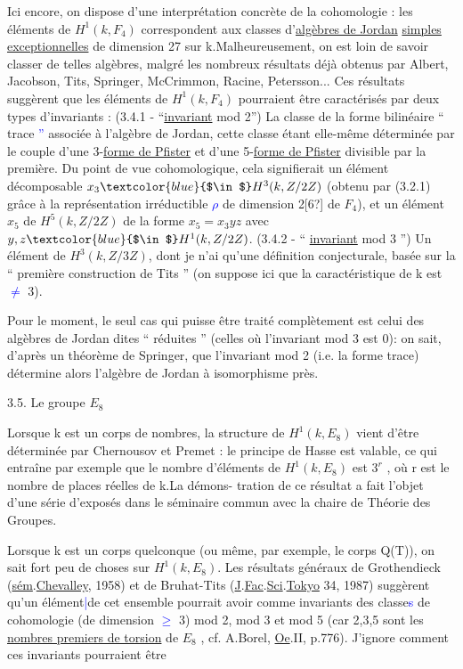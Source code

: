 \documentclass[11pt]{article}
\newcommand{\hand}[1]{\textcolor{blue}{#1}}
\newcommand{\uline}[1]{\underline{#1}}
\newcommand{\unsure}[1]{[#1?]}
\begin{document}
Ici encore, on dispose d'une interprétation concrète de la cohomologie :
les éléments de $H^1(k, F_4)$ correspondent aux classes d'\uline{algèbres de Jordan}
\uline{simples exceptionnelles} de dimension 27 sur k.Malheureusement, on
est loin de savoir classer de telles algèbres, malgré les nombreux
résultats déjà obtenus par Albert, Jacobson, Tits, Springer, McCrimmon,
Racine, Petersson... Ces résultats suggèrent que les éléments de
$H^1(k, F_4)$ pourraient être caractérisés par deux types d'invariants :
(3.4.1 - ``\uline{invariant} mod 2'') La classe de la forme bilinéaire `` trace \hand{''}
associée à l'algèbre de Jordan, cette classe étant elle-même déterminée
par le couple d'une 3-\uline{forme de Pfister} et d'une 5-\uline{forme de Pfister} divisible
par la première. Du point de vue cohomologique, cela signifierait un
élément décomposable $x_3 \hand{$\in$} H^3(k, Z/2Z)$ (obtenu par (3.2.1) grâce à la
représentation irréductible \hand{$\rho$} de dimension 2\unsure{6} de $F_4$), et un élément
$x_5$ de $H^5(k, Z/2Z)$ de la forme $x_5 = x_3yz$ avec $y,z \hand{$\in$} H^1(k, Z/2Z)$.
(3.4.2 - `` \uline{invariant} mod 3 '') Un élément de $H^3(k, Z/3Z)$, dont je n'ai
qu'une définition conjecturale, basée sur la `` première construction
de Tits '' (on suppose ici que la caractéristique de k est \hand{$\neq$} 3).

Pour le moment, le seul cas qui puisse être traité complètement est
celui des algèbres de Jordan dites `` réduites '' (celles où l'invariant
mod 3 est 0): on sait, d'après un théorème de Springer, que l'invariant
mod 2 (i.e. la forme trace) détermine alors l'algèbre de Jordan à isomorphisme
près.

3.5. Le groupe $E_8$

Lorsque k est un corps de nombres, la structure de $H^1(k, E_8)$ vient
d'être déterminée par Chernousov et Premet : le principe de Hasse est
valable, ce qui entraîne par exemple que le nombre d'éléments de
$H^1(k, E_8)$ est $3^r$ , où r est le nombre de places réelles de k.La démons-%
tration de ce résultat a fait l'objet d'une série d'exposés dans le séminaire
commun avec la chaire de Théorie des Groupes.

Lorsque k est un corps quelconque (ou même, par exemple, le corps
Q(T)), on sait fort peu de choses sur $H^1(k, E_8)$. Les résultats généraux de
Grothendieck (\uline{sém}.\uline{Chevalley}, 1958) et de Bruhat-Tits (\uline{J}.\uline{Fac}.\uline{Sci}.\uline{Tokyo}
34, 1987) suggèrent qu'un élément\hand{|}de cet ensemble pourrait avoir comme
invariants des classe\hand{s} de cohomologie (de dimension \hand{$\geqslant$} 3) mod 2, mod 3
et mod 5 (car 2,3,5 sont les \uline{nombres premiers de torsion} de $E_8$ ,
cf. A.Borel, \uline{Oe}.II, p.776). J'ignore comment ces invariants pourraient être
\end{document}
